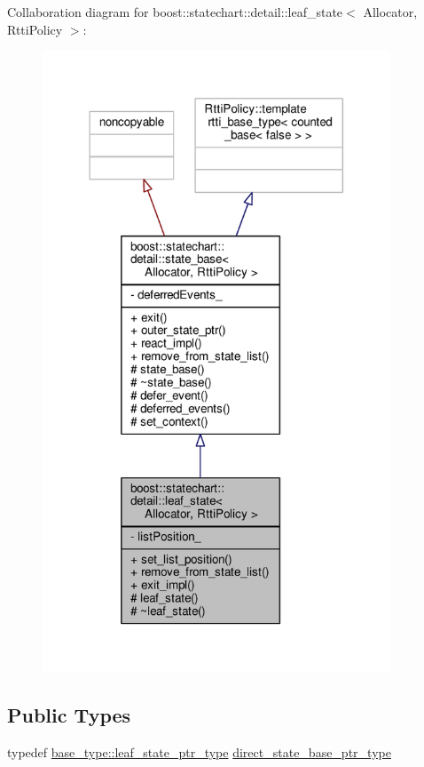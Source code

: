 Collaboration diagram for boost\+:\+:statechart\+:\+:detail\+:\+:leaf\+\_\+state$<$ Allocator, Rtti\+Policy $>$\+:
\nopagebreak
\begin{figure}[H]
\begin{center}
\leavevmode
\includegraphics[width=294pt]{classboost_1_1statechart_1_1detail_1_1leaf__state__coll__graph}
\end{center}
\end{figure}
\subsection*{Public Types}
\begin{DoxyCompactItemize}
\item 
typedef \mbox{\hyperlink{classboost_1_1statechart_1_1detail_1_1state__base_a80b7d62ba0bb8e4fbef3e2e76e2a6021}{base\+\_\+type\+::leaf\+\_\+state\+\_\+ptr\+\_\+type}} \mbox{\hyperlink{classboost_1_1statechart_1_1detail_1_1leaf__state_a50634727a16fd74c39340410b1e8217d}{direct\+\_\+state\+\_\+base\+\_\+ptr\+\_\+type}}
\end{DoxyCompactItemize}

